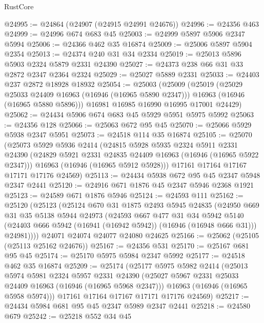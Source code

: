 \begin{lexlean}{RustCore}
\begin{coremodule}
@24995 := @24864 (@24907 (@24915 @24991 @24676))
@24996 := @24356 @463
@24999 := @24996 @674 @683 @45
@25003 := @24999 @5897 @5906 @2347 @5994
@25006 := @24366 @462 @35 @16874
@25009 := @25006 @5897 @5904 @2354
@25013 := @24374 @240 @31 @34 @2334
@25019 := @25013 @5896 @5903 @2324 @5879 @2331 @24390
@25027 := @24373 @238 @66 @31 @33 @2872 @2347 @2364 @2324
@25029 := @25027 @5889 @2331
@25033 := @24403 @237 @2872 @18928 @18932
@25054 := @25003
    (@25009
      (@25019
        (@25029 @25033 @24409 @16963 (@16946 (@16965 @5890 @2347)))
        @16963
        (@16946 (@16965 @5880 @5896)))
      @16981
      @16985
      @16990
      @16995
      @17001
      @24429)
@25062 := @24434 @5906 @674 @683 @45 @5929 @5951 @5975 @5992
@25063 := @24356 @128
@25066 := @25063 @672 @95 @45
@25070 := @25066 @5929 @5938 @2347 @5951
@25073 := @24518 @114 @35 @16874
@25105 := @25070
    (@25073
      @5929
      @5936
      @2414
      (@24815
        @5928
        @5935
        @2324
        @5911
        @2331
        @24390
        (@24829 @5921 @2331 @24835 @24409 @16963 (@16946 (@16965 @5922 @2347)))
        @16963
        (@16946 (@16965 @5912 @5928)))
      @17161
      @17164
      @17167
      @17171
      @17176
      @24569)
@25113 := @24434 @5938 @672 @95 @45 @2347 @5948 @2347 @2441
@25120 := @24916 @671 @1876 @45 @2347 @5946 @2368 @1921
@25123 := @24589 @671 @1876 @5946
@25124 := @24593 @111
@25162 := @25120
    (@25123
      (@25124
        @670
        @31
        @1875
        @2493
        @5945
        @24835
        (@24950
          @669
          @31
          @35
          @5138
          @5944
          @24973
          (@24593
            @667
            @477
            @31
            @34
            @5942
            @5140
            (@24403 @666 @5942 (@16941 (@16942 @5942)) (@16946 (@16948 @666 @31)))
            @24981))))
    @24071
    @24074
    @24077
    @24080
    @24625
@25166 := @25062 (@25105 (@25113 @25162 @24676))
@25167 := @24356 @531
@25170 := @25167 @681 @95 @45
@25174 := @25170 @5975 @5984 @2347 @5992
@25177 := @24518 @462 @35 @16874
@25209 := @25174
    (@25177
      @5975
      @5982
      @2414
      (@25013
        @5974
        @5981
        @2324
        @5957
        @2331
        @24390
        (@25027 @5967 @2331 @25033 @24409 @16963 (@16946 (@16965 @5968 @2347)))
        @16963
        (@16946 (@16965 @5958 @5974)))
      @17161
      @17164
      @17167
      @17171
      @17176
      @24569)
@25217 := @24434 @5984 @681 @95 @45 @2347 @5989 @2347 @2441
@25218 := @24580 @679
@25242 := @25218
    @552
    @34
    @45

\end{coremodule}
\end{lexlean}
